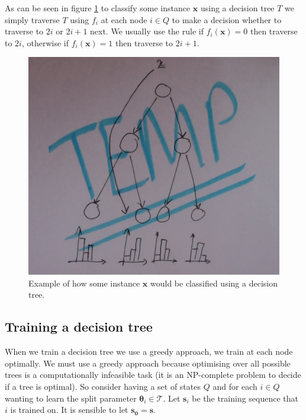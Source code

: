 \documentclass[12pt,twoside,notitlepage]{report}
\newcommand{\vc}[1]{\mathbf{#1}}
\newcommand{\cl}[1]{\mathcal{#1}}
\begin{document}
            As can be seen in figure \ref{fig:decision_tree_classify} to classify some instance $\vc{x}$ using a 
            decision tree $T$ we simply traverse $T$ using $f_i$ at each node $i \in Q$ to make a decision whether 
            to traverse to $2i$ or $2i+1$ next. We usually use the rule if $f_i(\vc{x}) = 0$ then traverse to 
            $2i$, otherwise if $f_i(\vc{x}) = 1$ then traverse to $2i+1$. \cite{criminisi2013decision}

            \begin{figure}[H]
                \centering
                \includegraphics[scale=0.5]{tree_example_classification.jpeg}
                \caption{Example of how some instance $\vc{x}$ would be classified using a decision tree.}
                \label{fig:decision_tree_classify}
            \end{figure}

        \subsection{Training a decision tree}
            When we train a decision tree we use a greedy approach, we train at each node optimally. We must use a 
            greedy approach because optimising over all possible trees is a computationally infeasible task (it is an 
            NP-complete problem to decide if a tree is optimal). So consider having a set of states $Q$ and for each 
            $i \in Q$ wanting to learn the split parameter $\vc{\theta}_i \in \cl{T}$. Let $\vc{s}_i$ be the training 
            sequence that $i$ is trained on. It is sensible to let $\vc{s_0}=\vc{s}$. 
\end{document}
